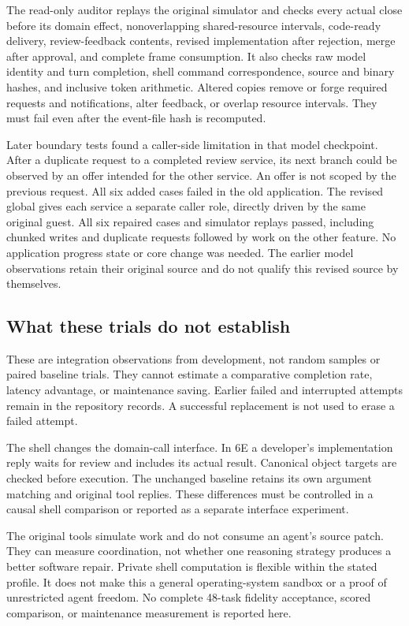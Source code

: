 \documentclass[10pt]{article}
\begin{document}
The read-only auditor replays the original simulator and checks every actual
close before its domain effect, nonoverlapping shared-resource intervals,
code-ready delivery, review-feedback contents, revised implementation after
rejection, merge after approval, and complete frame consumption. It also checks
raw model identity and turn completion, shell command correspondence, source
and binary hashes, and inclusive token arithmetic. Altered copies remove or
forge required requests and notifications, alter feedback, or overlap resource
intervals. They must fail even after the event-file hash is recomputed.

Later boundary tests found a caller-side limitation in that model checkpoint.
After a duplicate request to a completed review service, its next branch could
be observed by an offer intended for the other service. An offer is not scoped
by the previous request. All six added cases failed in the old application.
The revised global gives each service a separate caller role, directly driven
by the same original guest. All six repaired cases and simulator replays passed,
including chunked writes and duplicate requests followed by work on the other
feature. No application progress state or core change was needed. The earlier
model observations retain their original source and do not qualify this revised
source by themselves.

\subsection{What these trials do not establish}
These are integration observations from development, not random samples or
paired baseline trials. They cannot estimate a comparative completion rate,
latency advantage, or maintenance saving. Earlier failed and interrupted
attempts remain in the repository records. A successful replacement is not
used to erase a failed attempt.

The shell changes the domain-call interface. In 6E a developer's implementation
reply waits for review and includes its actual result. Canonical object targets
are checked before execution. The unchanged baseline retains its own argument
matching and original tool replies. These differences must be controlled in a
causal shell comparison or reported as a separate interface experiment.

The original tools simulate work and do not consume an agent's source patch.
They can measure coordination, not whether one reasoning strategy produces a
better software repair. Private shell computation is flexible within the
stated profile. It does not make this a general operating-system sandbox or a
proof of unrestricted agent freedom. No complete 48-task fidelity acceptance,
scored comparison, or maintenance measurement is reported here.
\end{document}
